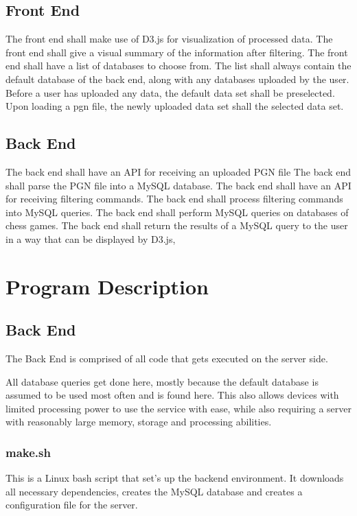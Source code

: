 \documentclass{article}
\begin{document}
\subsection{Front End}
The front end shall make use of D3.js for visualization of processed data.
The front end shall give a visual summary of the information after filtering.
The front end shall have a list of databases to choose from.  The list shall always contain the default database of the back end, along with any databases uploaded by the user.
Before a user has uploaded any data, the default data set shall be preselected.
Upon loading a pgn file, the newly uploaded data set shall the selected data set.

\subsection{Back End}
The back end shall have an API for receiving an uploaded PGN file
The back end shall parse the PGN file into a MySQL database.
The back end shall have an API for receiving filtering commands.
The back end shall process filtering commands into MySQL queries.
The back end shall perform MySQL queries on databases of chess games.
The back end shall return the results of a MySQL query to the user in a way that can be displayed by D3.js, %

\section{Program Description}

\subsection{Back End}
The Back End is comprised of all code that gets executed on the server side.

All database queries get done here, mostly because the default database is assumed to be used most often and is found here. This also allows devices with limited processing power to use the service with ease, while also requiring a server with reasonably large memory, storage and processing abilities.

\subsubsection{make.sh}
This is a Linux bash script that set's up the backend environment. It downloads all necessary dependencies, creates the MySQL database and creates a configuration file for the server.
\end{document}
